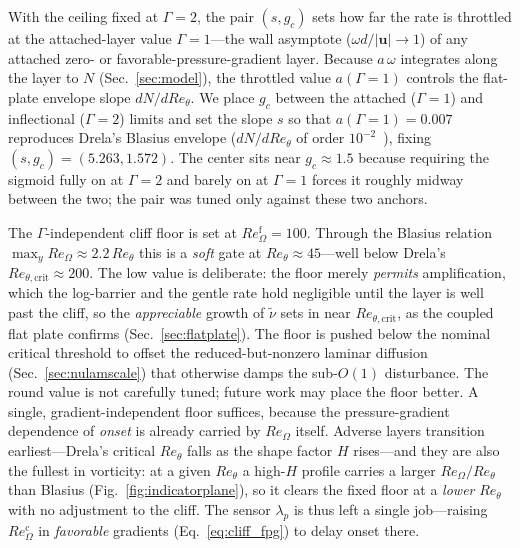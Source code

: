\documentclass[journal]{new-aiaa}
\begin{document}
With the ceiling fixed at $\Gamma\!=\!2$, the pair $(s,g_c)$ sets how far the rate
is throttled at the attached-layer value $\Gamma\!=\!1$---the wall asymptote
($\omega d/|\mathbf{u}|\!\to\!1$) of any attached zero- or favorable-pressure-gradient
layer. Because $a\,\omega$
integrates along the layer to $N$ (Sec.~\ref{sec:model}), the
throttled value $a(\Gamma\!=\!1)$ controls the flat-plate envelope slope
$dN/dRe_\theta$. We place $g_c$ between the attached ($\Gamma\!=\!1$) and
inflectional ($\Gamma\!=\!2$) limits and set the slope $s$ so that
$a(\Gamma\!=\!1)\!=\!0.007$ reproduces Drela's Blasius envelope
($dN/dRe_\theta$ of order $10^{-2}$~\cite{drela_giles_1987}), fixing
$(s,g_c)\!=\!(5.263,1.572)$. The center sits near $g_c\!\approx\!1.5$ because requiring the
sigmoid fully on at $\Gamma\!=\!2$ and barely on at
$\Gamma\!=\!1$ forces it roughly midway between the two; the pair was tuned
only against these two anchors.

The $\Gamma$-independent cliff floor is set at $Re_\Omega^{\mathrm{f}}\!=\!100$.
Through the Blasius relation $\max_y Re_\Omega\!\approx\!2.2\,Re_\theta$ this is a
\emph{soft} gate at $Re_\theta\!\approx\!45$---well below Drela's
$Re_{\theta,\mathrm{crit}}\!\approx\!200$. The low value is deliberate: the
floor merely \emph{permits} amplification, which the log-barrier
and the gentle rate hold negligible until the layer is well past the cliff, so
the \emph{appreciable} growth of $\tilde\nu$ sets in near
$Re_{\theta,\mathrm{crit}}$, as the coupled flat plate confirms
(Sec.~\ref{sec:flatplate}). The floor is pushed below the nominal critical
threshold to offset the reduced-but-nonzero laminar diffusion
(Sec.~\ref{sec:nulamscale}) that otherwise damps the sub-$O(1)$ disturbance.
The round value is not carefully tuned; future work may place the floor
better.
A single, gradient-independent floor suffices, because the pressure-gradient
dependence of \emph{onset} is already carried by $Re_\Omega$ itself. Adverse
layers transition earliest---Drela's critical $Re_\theta$ falls as the shape
factor $H$ rises---and they are also the fullest in vorticity: at a given
$Re_\theta$ a high-$H$ profile carries a larger $Re_\Omega/Re_\theta$ than Blasius
(Fig.~\ref{fig:indicatorplane}), so it clears the fixed floor at a \emph{lower}
$Re_\theta$ with no adjustment to the cliff. The sensor $\lambda_p$ is thus left a
single job---raising $Re_\Omega^{\mathrm{c}}$ in \emph{favorable} gradients
(Eq.~\eqref{eq:cliff_fpg}) to delay onset there.
\end{document}
